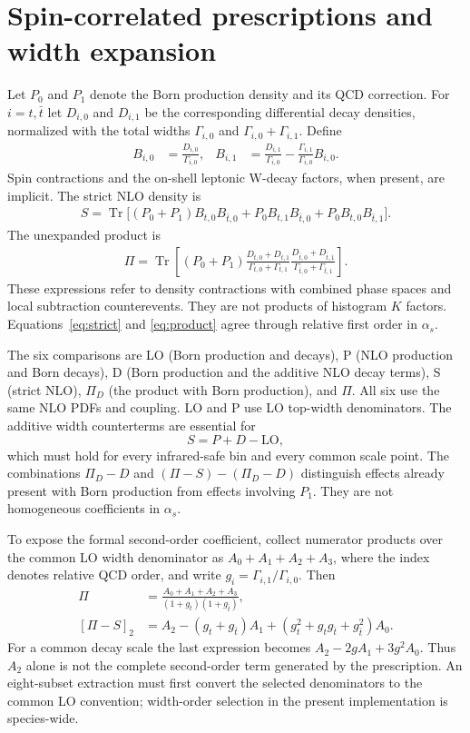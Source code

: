 \documentclass[11pt,a4paper]{article}
\newcommand{\Tr}{\operatorname{Tr}}
\newcommand{\as}{\alpha_s}
\begin{document}
\section{Spin-correlated prescriptions and width expansion}

Let $P_0$ and $P_1$ denote the Born production density and its QCD
correction. For $i=t,\bar t$ let $D_{i,0}$ and $D_{i,1}$ be the
corresponding differential decay densities, normalized with the total
widths $\Gamma_{i,0}$ and $\Gamma_{i,0}+\Gamma_{i,1}$. Define
\begin{align}
B_{i,0}&=\frac{D_{i,0}}{\Gamma_{i,0}},&
B_{i,1}&=\frac{D_{i,1}}{\Gamma_{i,0}}
 -\frac{\Gamma_{i,1}}{\Gamma_{i,0}}B_{i,0}.
\end{align}
Spin contractions and the on-shell leptonic W-decay factors, when present,
are implicit. The strict NLO density is
\begin{align}
S=\Tr\big[(P_0+P_1)B_{t,0}B_{\bar t,0}
 +P_0B_{t,1}B_{\bar t,0}+P_0B_{t,0}B_{\bar t,1}\big].
\label{eq:strict}
\end{align}
The unexpanded product is
\begin{align}
\Pi=\Tr\left[(P_0+P_1)
\frac{D_{t,0}+D_{t,1}}{\Gamma_{t,0}+\Gamma_{t,1}}
\frac{D_{\bar t,0}+D_{\bar t,1}}{\Gamma_{\bar t,0}+\Gamma_{\bar t,1}}\right].
\label{eq:product}
\end{align}
These expressions refer to density contractions with combined phase spaces
and local subtraction counterevents. They are not products of histogram
$K$ factors. Equations~\eqref{eq:strict} and \eqref{eq:product} agree through
relative first order in $\as$.

The six comparisons are LO (Born production and decays), P (NLO production
and Born decays), D (Born production and the additive NLO decay terms),
S (strict NLO), $\Pi_D$ (the product with Born production), and $\Pi$.
All six use the same NLO PDFs and coupling. LO and P use LO top-width
denominators. The additive width counterterms are essential for
\begin{equation}
S=P+D-\mathrm{LO},
\end{equation}
which must hold for every infrared-safe bin and every common scale point.
The combinations $\Pi_D-D$ and $(\Pi-S)-(\Pi_D-D)$ distinguish effects
already present with Born production from effects involving $P_1$.
They are not homogeneous coefficients in $\as$.

To expose the formal second-order coefficient, collect numerator products
over the common LO width denominator as $A_0+A_1+A_2+A_3$, where the
index denotes relative QCD order, and write
$g_i=\Gamma_{i,1}/\Gamma_{i,0}$. Then
\begin{align}
\Pi&=\frac{A_0+A_1+A_2+A_3}{(1+g_t)(1+g_{\bar t})},\\
[\Pi-S]_2&=A_2-(g_t+g_{\bar t})A_1
 +(g_t^2+g_tg_{\bar t}+g_{\bar t}^2)A_0.
\end{align}
For a common decay scale the last expression becomes
$A_2-2gA_1+3g^2A_0$. Thus $A_2$ alone is not the complete second-order
term generated by the prescription. An eight-subset extraction must first
convert the selected denominators to the common LO convention; width-order
selection in the present implementation is species-wide.
\end{document}
